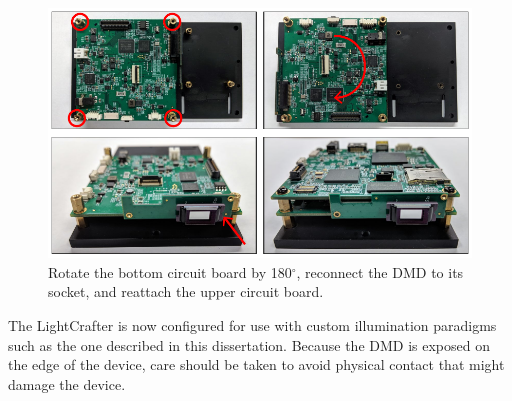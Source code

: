 \begin{figure}
    \includegraphics{figures/appendix_b/dmd_mod_6.pdf}
    \caption {
        \label{fig:dmd_mod_6}
        Rotate the bottom circuit board by 180$^\circ$, reconnect the DMD to its socket, and reattach the upper circuit board.
    }
\end{figure}

The LightCrafter is now configured for use with custom illumination paradigms such as the one described in this dissertation. Because the DMD is exposed on the edge of the device, care should be taken to avoid physical contact that might damage the device.



